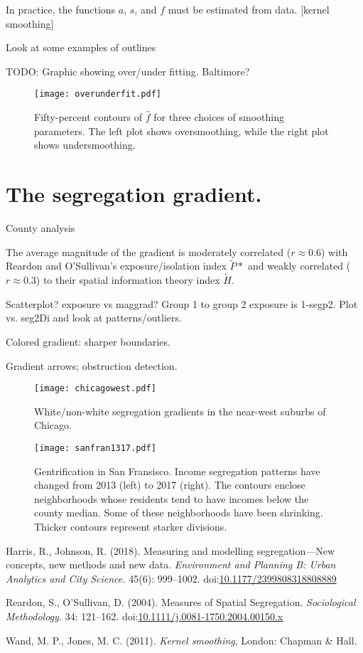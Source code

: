 \documentclass{article}
\theoremstyle{theorem}
\theoremstyle{definition}
\begin{document}
In practice, the functions $a$, $s$, and $f$ must be estimated from data. [kernel smoothing] \cite{wandjones11}

Look at some examples of outlines

TODO: Graphic showing over/under fitting. Baltimore?

\begin{figure}
  \texttt{[image: overunderfit.pdf]}
  \caption{Fifty-percent contours of $\hat{f}$ for three choices of smoothing parameters. The left plot shows oversmoothing, while the right plot shows undersmoothing.}
  \label{fig:overunderfit}
\end{figure}

\section{The segregation gradient.}

County analysis

The average magnitude of the gradient is moderately correlated ($r \approx 0.6$) with Reardon and O'Sullivan's exposure/isolation index $\tilde{P}*$ and weakly correlated ($r\approx 0.3$) to their spatial information theory index $\tilde{H}$.

Scatterplot? exposure vs maggrad? Group 1 to group 2 exposure is 1-segp2. Plot vs. seg2Di and look at patterns/outliers.

Colored gradient: sharper boundaries.

Gradient arrows; obstruction detection.

\begin{figure}
  \texttt{[image: chicagowest.pdf]}
  \caption{White/non-white segregation gradients in the near-west suburbs of Chicago.}
  \label{fig:chicagowest}
\end{figure}

\begin{figure}
  \texttt{[image: sanfran1317.pdf]}
  \caption{Gentrification in San Fransisco. Income segregation patterns have changed from 2013 (left) to 2017 (right). The contours enclose neighborhoods whose residents tend to have incomes below the county median. Some of these neighborhoods have been shrinking. Thicker contours represent starker divisions.}
  \label{fig:sanfran1317}
\end{figure}


\begin{thebibliography}{3}

Harris, R., Johnson, R. (2018). Measuring and modelling segregation---New concepts, new methods and new data. \textit{Environment and Planning B: Urban Analytics and City Science.} 45(6): 999--1002. doi:\href{http://dx.doi.org/10.1177/2399808318808889}{10.1177/2399808318808889}

Reardon, S., O'Sullivan, D. (2004). Measures of Spatial Segregation. \textit{Sociological Methodology.} 34: 121--162. doi:\href{http://dx.doi.org/10.1111/j.0081-1750.2004.00150.x}{10.1111/j.0081-1750.2004.00150.x}

 Wand, M. P., Jones, M. C. (2011). \textit{Kernel smoothing}, London: Chapman \& Hall.

\end{thebibliography}
\end{document}
